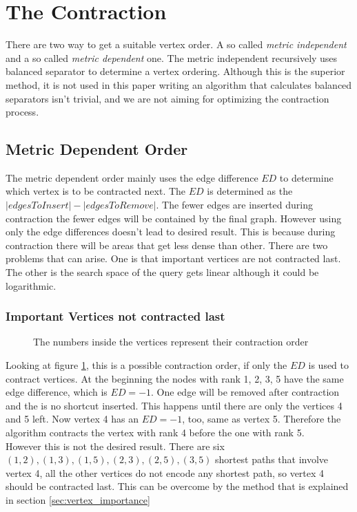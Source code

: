 \section{The Contraction}

There are two way to get a suitable vertex order. A so called \textit{metric independent} and a so called \textit{metric dependent} one. The metric independent recursively uses balanced separator to determine a vertex ordering\cite{CCH}. Although this is the superior method, it is not used in this paper writing an algorithm that calculates balanced separators isn't trivial, and we are not aiming for optimizing the contraction process. 

\subsection{Metric Dependent Order}

The metric dependent order mainly uses the edge difference $ED$ to determine which vertex is to be contracted next. The $ED$ is determined as the $|edges To Insert| - |edges To Remove|$. The fewer edges are inserted during contraction the fewer edges will be contained by the final graph. However using only the edge differences doesn't lead to desired result. This is because during contraction there will be areas that get less dense than other. There are two problems that can arise. One is that important vertices are not contracted last. The other is the search space of the query gets linear although it could be logarithmic.

\subsubsection{Important Vertices not contracted last}\label{sec:not_contracted_last}

\begin{figure}
    \centering
    
    \caption{The numbers inside the vertices represent their contraction order}
    \label{fig:not_contracted_last}
\end{figure}

Looking at figure \ref{fig:not_contracted_last}, this is a possible contraction order, if only the $ED$ is used to contract vertices. At the beginning the nodes with rank 1, 2, 3, 5 have the same edge difference, which is $ED = -1$. One edge will be removed after contraction and the is no shortcut inserted. This happens until there are only the vertices 4 and 5 left. Now vertex 4 has an $ED=-1$, too, same as vertex 5. Therefore the algorithm contracts the vertex with rank 4 before the one with rank 5. \\
However this is not the desired result. There are six ${(1,2), (1,3), (1,5), (2,3), (2,5), (3,5)}$ shortest paths that involve vertex 4, all the other vertices do not encode any shortest path, so vertex 4 should be contracted last. This can be overcome by the method that is explained in section \ref{sec:vertex_importance}

